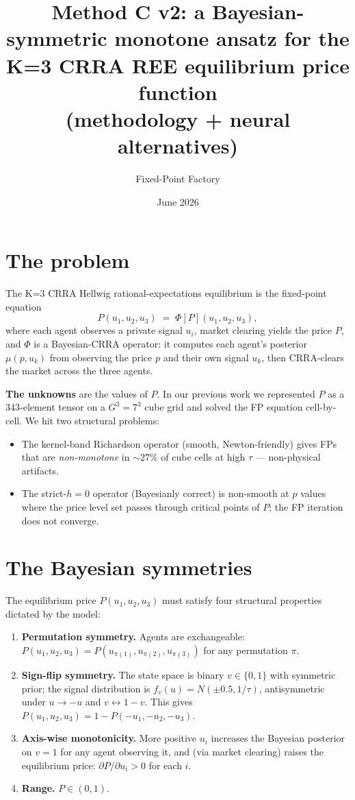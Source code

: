 \documentclass[11pt]{article}
\title{Method C v2: a Bayesian-symmetric monotone ansatz for the\\
       K=3 CRRA REE equilibrium price function\\
       (methodology + neural alternatives)}
\author{Fixed-Point Factory}
\date{June 2026}
\begin{document}
\maketitle

\section{The problem}

The K=3 CRRA Hellwig rational-expectations equilibrium is the
fixed-point equation
\[
P(u_1, u_2, u_3) \;=\; \Phi[P](u_1, u_2, u_3),
\]
where each agent observes a private signal $u_i$, market clearing
yields the price $P$, and $\Phi$ is a Bayesian-CRRA operator: it computes
each agent's posterior $\mu(p, u_k)$ from observing the price $p$ and their
own signal $u_k$, then CRRA-clears the market across the three agents.

\textbf{The unknowns} are the values of $P$. In our previous work we
represented $P$ as a 343-element tensor on a $G^3 = 7^3$ cube grid and
solved the FP equation cell-by-cell. We hit two structural problems:
\begin{itemize}
  \item The kernel-band Richardson operator (smooth, Newton-friendly) gives
        FPs that are \emph{non-monotone} in $\sim 27\%$ of cube cells at
        high $\tau$ --- non-physical artifacts.
  \item The strict-$h{=}0$ operator (Bayesianly correct) is non-smooth at
        $p$ values where the price level set passes through critical points
        of $P$; the FP iteration does not converge.
\end{itemize}

\section{The Bayesian symmetries}

The equilibrium price $P(u_1, u_2, u_3)$ must satisfy four structural
properties dictated by the model:

\begin{enumerate}
  \item \textbf{Permutation symmetry.} Agents are exchangeable:
        $P(u_1, u_2, u_3) = P(u_{\pi(1)}, u_{\pi(2)}, u_{\pi(3)})$ for any
        permutation $\pi$.
  \item \textbf{Sign-flip symmetry.} The state space is binary
        $v \in \{0, 1\}$ with symmetric prior; the signal distribution is
        $f_v(u) = N(\pm 0.5, 1/\tau)$, antisymmetric under $u \to -u$ and
        $v \leftrightarrow 1-v$. This gives
        $P(u_1, u_2, u_3) = 1 - P(-u_1, -u_2, -u_3)$.
  \item \textbf{Axis-wise monotonicity.} More positive $u_i$ increases the
        Bayesian posterior on $v=1$ for any agent observing it, and (via
        market clearing) raises the equilibrium price:
        $\partial P / \partial u_i > 0$ for each $i$.
  \item \textbf{Range.} $P \in (0, 1)$.
\end{enumerate}
\end{document}

